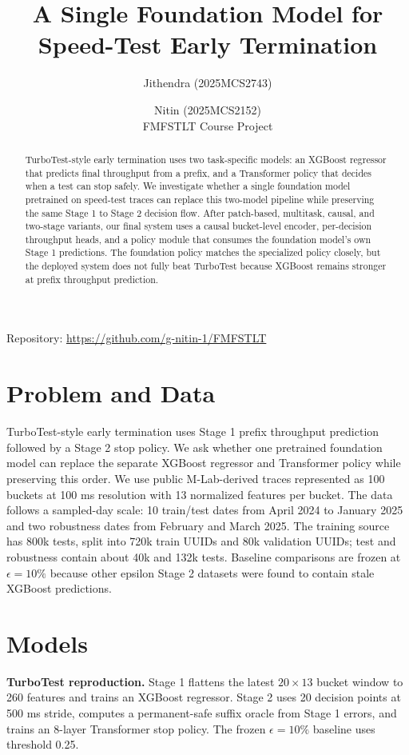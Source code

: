 \documentclass[10pt,twocolumn]{article}
\title{A Single Foundation Model for Speed-Test Early Termination}
\author{Jithendra (2025MCS2743) \and Nitin (2025MCS2152)\\
FMFSTLT Course Project}
\date{}
\newcommand{\eps}{\epsilon}
\begin{document}
\maketitle

\begin{center}
\small Repository: \url{https://github.com/g-nitin-1/FMFSTLT}
\end{center}
\vspace{-0.5em}

\begin{abstract}
TurboTest-style early termination uses two task-specific models: an XGBoost regressor that predicts final throughput from a prefix, and a Transformer policy that decides when a test can stop safely. We investigate whether a single foundation model pretrained on speed-test traces can replace this two-model pipeline while preserving the same Stage 1 to Stage 2 decision flow. After patch-based, multitask, causal, and two-stage variants, our final system uses a causal bucket-level encoder, per-decision throughput heads, and a policy module that consumes the foundation model's own Stage 1 predictions. The foundation policy matches the specialized policy closely, but the deployed system does not fully beat TurboTest because XGBoost remains stronger at prefix throughput prediction.
\end{abstract}

\section{Problem and Data}
TurboTest-style early termination uses Stage 1 prefix throughput prediction followed by a Stage 2 stop policy. We ask whether one pretrained foundation model can replace the separate XGBoost regressor and Transformer policy while preserving this order. We use public M-Lab-derived traces represented as 100 buckets at 100 ms resolution with 13 normalized features per bucket. The data follows a sampled-day scale: 10 train/test dates from April 2024 to January 2025 and two robustness dates from February and March 2025. The training source has 800k tests, split into 720k train UUIDs and 80k validation UUIDs; test and robustness contain about 40k and 132k tests. Baseline comparisons are frozen at $\eps=10\%$ because other epsilon Stage 2 datasets were found to contain stale XGBoost predictions.

\section{Models}
\textbf{TurboTest reproduction.} Stage 1 flattens the latest $20\times13$ bucket window to 260 features and trains an XGBoost regressor. Stage 2 uses 20 decision points at 500 ms stride, computes a permanent-safe suffix oracle from Stage 1 errors, and trains an 8-layer Transformer stop policy. The frozen $\eps=10\%$ baseline uses threshold 0.25.
\end{document}
